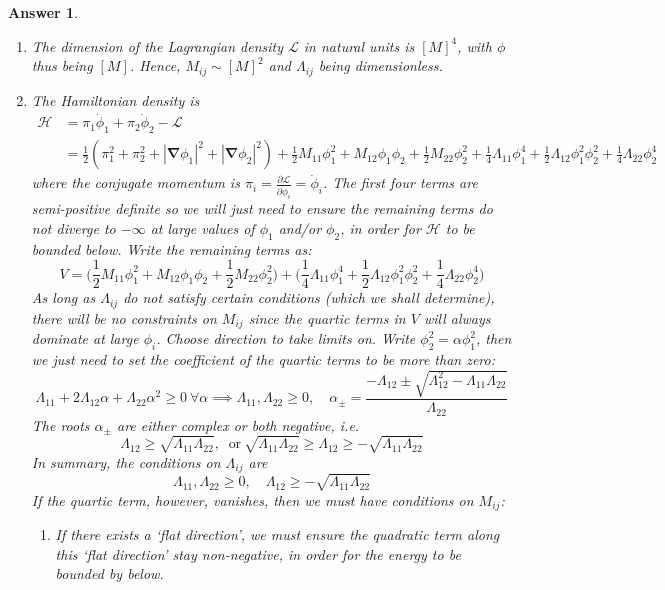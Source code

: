 \documentclass[a4paper]{article}
\newtheorem{ans}{Answer}[section]
\theoremstyle{new}
\begin{document}
\begin{ans}\leavevmode
\begin{enumerate}[label=(\alph*)]
\item The dimension of the Lagrangian density $\mathcal{L}$ in natural units is $[M]^4$, with $\phi$ thus being $[M]$. Hence, $M_{ij}\sim [M]^2$ and $\Lambda_{ij}$ being dimensionless.
\item The Hamiltonian density is
\begin{align}
    \mathcal{H}&=\pi_1\dot{\phi}_1+\pi_2\dot{\phi}_2-\mathcal{L}\nonumber\\&=\frac{1}{2}(\pi_1^2+\pi_2^2+|\boldsymbol{\nabla}\phi_1|^2+|\boldsymbol{\nabla}\phi_2|^2)+\frac{1}{2}M_{11}\phi_1^2+ M_{12} \phi_1\phi_2+\frac{1}{2}M_{22}\phi_2^2+\frac{1}{4}\Lambda_{11}\phi_1^4+\frac{1}{2}\Lambda_{12}\phi_1^2\phi_2^2+\frac{1}{4}\Lambda_{22}\phi_2^4\nonumber
\end{align}
where the conjugate momentum is $\pi_i=\frac{\partial\mathcal{L}}{\partial\dot{\phi}_i}=\dot{\phi}_i$. The first four terms are semi-positive definite so we will just need to ensure the remaining terms do not diverge to $-\infty$ at large values of $\phi_1$ and/or $\phi_2$, in order for $\mathcal{H}$ to be bounded below. Write the remaining terms as:
$$V=\bigg(\frac{1}{2}M_{11}\phi_1^2+ M_{12} \phi_1\phi_2+\frac{1}{2}M_{22}\phi_2^2\bigg)+\bigg(\frac{1}{4}\Lambda_{11}\phi_1^4+\frac{1}{2}\Lambda_{12}\phi_1^2\phi_2^2+\frac{1}{4}\Lambda_{22}\phi_2^4\bigg)$$
As long as $\Lambda_{ij}$ do not satisfy certain conditions (which we shall determine), there will be no constraints on $M_{ij}$ since the quartic terms in $V$ will always dominate at large $\phi_i$. Choose direction to take limits on. Write $\phi_2^2=\alpha\phi_1^2$, then we just need to set the coefficient of the quartic terms to be more than zero:
$$\Lambda_{11}+2\Lambda_{12}\alpha+\Lambda_{22}\alpha^2\geq0~\forall\alpha\implies\Lambda_{11},\Lambda_{22}\geq0,\quad\alpha_\pm=\frac{-\Lambda_{12}\pm\sqrt{\Lambda_{12}^2-\Lambda_{11}\Lambda_{22}}}{\Lambda_{22}}$$
The roots $\alpha_\pm$ are either complex or both negative, i.e.
$$\Lambda_{12}\geq\sqrt{\Lambda_{11}\Lambda_{22}},~\text{ or}~\sqrt{\Lambda_{11}\Lambda_{22}}\geq\Lambda_{12}\geq-\sqrt{\Lambda_{11}\Lambda_{22}}$$
In summary, the conditions on $\Lambda_{ij}$ are
$$\Lambda_{11},\Lambda_{22}\geq0,\quad\Lambda_{12}\geq-\sqrt{\Lambda_{11}\Lambda_{22}}$$
If the quartic term, however, vanishes, then we must have conditions on $M_{ij}$:
\begin{enumerate}
    \item If there exists a `flat direction', we must ensure the quadratic term along this `flat direction' stay non-negative, in order for the energy to be bounded by below.

\end{enumerate}
\end{enumerate}
\end{ans}
\end{document}
